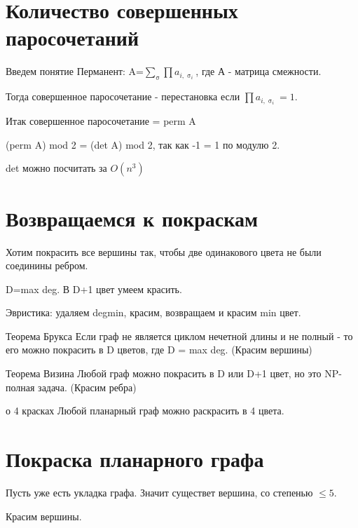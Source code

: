 \section{Количество совершенных паросочетаний}

Введем понятие Перманент: A=$\sum_{\upsigma} \prod a_{i, \upsigma_{i}}$, где А - матрица  смежности.

Тогда совершенное паросочетание - перестановка если $\prod a_{i, {\upsigma_{i}}} = 1$.

Итак совершенное паросочетание = perm A

(perm A) mod 2 = (det A) mod 2, так как -1 = 1 по модулю 2.
\begin{Rem}
det можно посчитать за $O(n^3)$
\end{Rem}

\section{Возвращаемся к покраскам}
Хотим покрасить все вершины так, чтобы две одинакового цвета не были соединины ребром.

D=max deg. В D+1 цвет умеем красить.

Эвристика: удаляем degmin, красим, возвращаем и красим min цвет.

\begin{theorem}{Теорема Брукса}
Если граф не является циклом нечетной длины  и не полный - то его можно покрасить в D цветов, где D = max deg.
(Красим вершины)
\end{theorem}

\begin{theorem}{Теорема Визина}
Любой граф можно покрасить в D или D+1 цвет, но это NP-полная задача.
(Красим ребра)
\end{theorem}

\begin{theorem}{о 4 красках} 
Любой планарный граф можно раскрасить в 4 цвета.
\end{theorem}

\section{Покраска планарного графа}

Пусть уже есть укладка графа. Значит существет вершина, со степенью $\le 5$.

Красим вершины.


